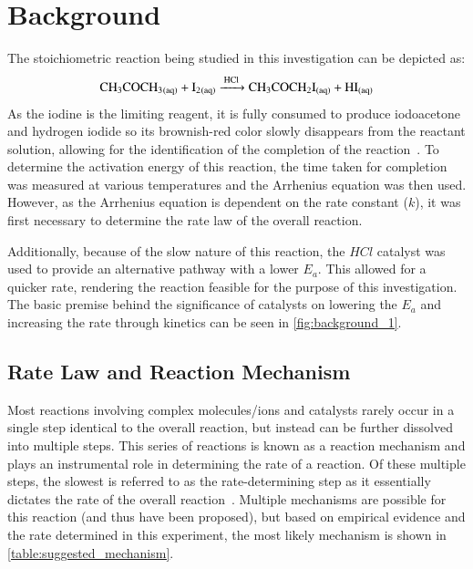 \section{Background}
The stoichiometric reaction being studied in this investigation can be depicted as:
\[\ce{CH3COCH3_{(aq)} + I2_{(aq)} ->[HCl] CH3COCH2I_{(aq)} + HI_{(aq)}}\]
As the iodine is the limiting reagent, it is fully consumed to produce iodoacetone and hydrogen iodide so its brownish-red color slowly disappears from the reactant solution, allowing for the identification of the completion of the reaction~\parencite{other_literature_2, iodioacetone}. To determine the activation energy of this reaction, the time taken for completion was measured at various temperatures and the Arrhenius equation was then used. However, as the Arrhenius equation is dependent on the rate constant ($k$), it was first necessary to determine the rate law of the overall reaction.

Additionally, because of the slow nature of this reaction, the $HCl$ catalyst was used to provide an alternative pathway with a lower $E_a$. This allowed for a quicker rate, rendering the reaction feasible for the purpose of this investigation. The basic premise behind the significance of catalysts on lowering the $E_a$ and increasing the rate through kinetics can be seen in \cref{fig:background_1}.



\subsection{Rate Law and Reaction Mechanism}
Most reactions involving complex molecules/ions and catalysts rarely occur in a single step identical to the overall reaction, but instead can be further dissolved into multiple steps. This series of reactions is known as a reaction mechanism and plays an instrumental role in determining the rate of a reaction. Of these multiple steps, the slowest is referred to as the rate-determining step as it essentially dictates the rate of the overall reaction~\parencite{mechanism_information_ketone}. Multiple mechanisms are possible for this reaction (and thus have been proposed), but based on empirical evidence and the rate determined in this experiment, the most likely mechanism is shown in \cref{table:suggested_mechanism}.

